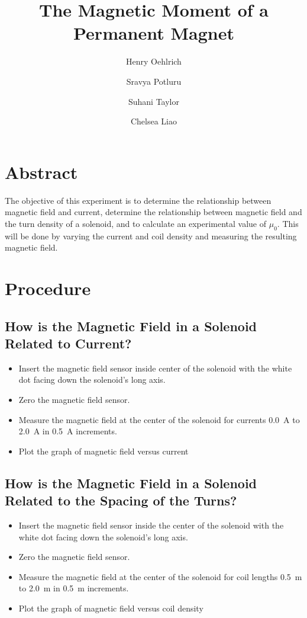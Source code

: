 \documentclass{article}
\title{The Magnetic Moment of a Permanent Magnet}
\author{Henry Oehlrich\and Sravya Potluru\and Suhani Taylor\and Chelsea Liao}
\begin{document}
\maketitle

\section{Abstract}

The objective of this experiment is to determine the relationship between
magnetic field and current, determine the relationship between magnetic field
and the turn density of a solenoid, and to calculate an experimental value of
$\mu_0$. This will be done by varying the current and coil density and
measuring the resulting magnetic field.

\section{Procedure}

\subsection{How is the Magnetic Field in a Solenoid Related to Current?}

\begin{itemize}
    \item Insert the magnetic field sensor inside center of the solenoid with
        the white dot facing down the solenoid's long axis.
    \item Zero the magnetic field sensor.
    \item Measure the magnetic field at the center of the solenoid for currents
        \SI{0.0}{\ampere} to \SI{2.0}{\ampere} in \SI{0.5}{\ampere} increments.
    \item Plot the graph of magnetic field versus current
\end{itemize}

\subsection{How is the Magnetic Field in a Solenoid Related to the Spacing of the Turns?}

\begin{itemize}
    \item Insert the magnetic field sensor inside the center of the solenoid
        with the white dot facing down the solenoid's long axis.
    \item Zero the magnetic field sensor.
    \item Measure the magnetic field at the center of the solenoid for coil
        lengths \SI{0.5}{\meter} to \SI{2.0}{\meter} in \SI{0.5}{\meter} increments.
    \item Plot the graph of magnetic field versus coil density
\end{itemize}
\end{document}

